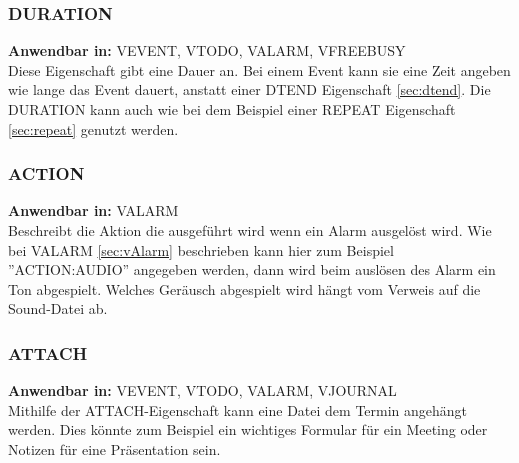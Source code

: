 \subsubsection{DURATION}
\label{sec:duration}
\textbf{Anwendbar in:} VEVENT, VTODO, VALARM, VFREEBUSY\\
Diese Eigenschaft gibt eine Dauer an. Bei einem Event kann sie eine Zeit angeben wie lange das Event dauert, anstatt einer DTEND Eigenschaft \ref{sec:dtend}. Die DURATION kann auch wie bei dem Beispiel einer REPEAT Eigenschaft \ref{sec:repeat} genutzt werden.
\subsubsection{ACTION}
\label{sec:action}
\textbf{Anwendbar in:} VALARM \\
Beschreibt die Aktion die ausgeführt wird wenn ein Alarm ausgelöst wird. Wie bei VALARM \ref{sec:vAlarm} beschrieben kann hier zum Beispiel ''ACTION:AUDIO'' angegeben werden, dann wird beim auslösen des Alarm ein Ton abgespielt. Welches Geräusch abgespielt wird hängt vom Verweis auf die Sound-Datei ab. 
\subsubsection{ATTACH}
\label{sec:attach}
\textbf{Anwendbar in:} VEVENT, VTODO, VALARM, VJOURNAL\\
Mithilfe der ATTACH-Eigenschaft kann eine Datei dem Termin angehängt werden. Dies könnte zum Beispiel ein wichtiges Formular für ein Meeting oder Notizen für eine Präsentation sein.
\\ \\ \\ \\
\textcite{KanzakiKeywords}
\pagebreak